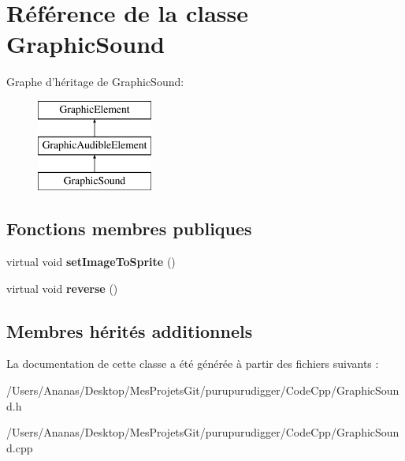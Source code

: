 \hypertarget{class_graphic_sound}{\section{Référence de la classe Graphic\-Sound}
\label{class_graphic_sound}
}
Graphe d'héritage de Graphic\-Sound\-:\begin{figure}[H]
\begin{center}
\leavevmode
\includegraphics[height=3.000000cm]{class_graphic_sound}
\end{center}
\end{figure}
\subsection*{Fonctions membres publiques}
\begin{DoxyCompactItemize}
\item 
\hypertarget{class_graphic_sound_a2d2cd8f4d8494ec67a82d17aa7e40551}{virtual void {\bfseries set\-Image\-To\-Sprite} ()}\label{class_graphic_sound_a2d2cd8f4d8494ec67a82d17aa7e40551}

\item 
\hypertarget{class_graphic_sound_a45c58758081239bd45bc6b03eaea8989}{virtual void {\bfseries reverse} ()}\label{class_graphic_sound_a45c58758081239bd45bc6b03eaea8989}

\end{DoxyCompactItemize}
\subsection*{Membres hérités additionnels}


La documentation de cette classe a été générée à partir des fichiers suivants \-:\begin{DoxyCompactItemize}
\item 
/\-Users/\-Ananas/\-Desktop/\-Mes\-Projets\-Git/purupurudigger/\-Code\-Cpp/Graphic\-Sound.\-h\item 
/\-Users/\-Ananas/\-Desktop/\-Mes\-Projets\-Git/purupurudigger/\-Code\-Cpp/Graphic\-Sound.\-cpp\end{DoxyCompactItemize}
